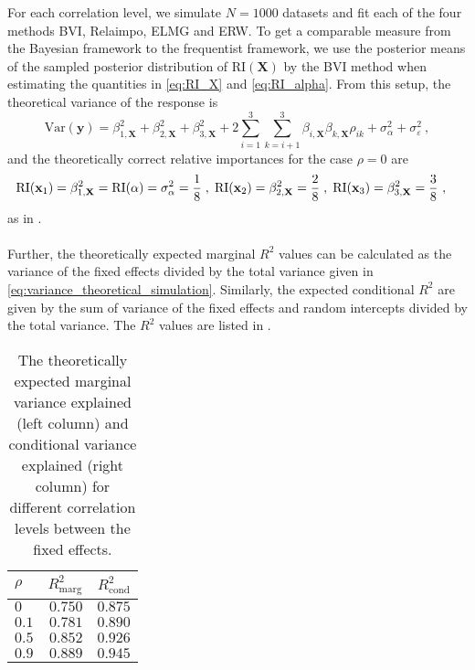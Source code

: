 For each correlation level, we simulate $N=1000$ datasets and fit each of the four methods BVI, Relaimpo, ELMG and ERW.
To get a comparable measure from the Bayesian framework to the frequentist framework, we use the posterior means of the sampled posterior distribution of $\text{RI}(\mathbf{X})$ by the BVI method when estimating the quantities in  \eqref{eq:RI_X} and \eqref{eq:RI_alpha}.
\newline
\newline
From this setup, the theoretical variance of the response is
\begin{equation}
    \label{eq:variance_theoretical_simulation}
    \text{Var}(\mathbf{y}) = \beta_{1, \mathbf{X}}^2 + \beta_{2, \mathbf{X}}^2 + \beta_{3, \mathbf{X}}^2 + 2\sum_{i=1}^{3}\sum_{k=i+1}^{3} \beta_{i, \mathbf{X}}\beta_{k, \mathbf{X}}\rho_{ik} + \sigma_{\alpha}^2 + \sigma^2_{\varepsilon} \ , 
\end{equation}
and the theoretically correct relative importances for the case $\rho=0$ are
\begin{equation}
    \label{eq:RI_theoretical_simulation}
    \begin{aligned}
        \text{RI}(\mathbf{x}_1) =  \beta_{1, \mathbf{X}}^2& = \text{RI}(\alpha) = \sigma^2_{\alpha} = \frac{1}{8} \hspace{1mm}, \hspace{1mm} \text{RI}(\mathbf{x}_2) = \beta_{2, \mathbf{X}}^2 = \frac{2}{8} \hspace{1mm}, \hspace{1mm} \text{RI}(\mathbf{x}_3) = \beta_{3, \mathbf{X}}^2 = \frac{3}{8} \ , 
    \end{aligned}
\end{equation}
as in \citet{gromping_relaimpo}.
\\
\\
Further, the theoretically expected marginal $R^2$ values can be calculated as the variance of the fixed effects divided by the total variance given in \ref{eq:variance_theoretical_simulation}. Similarly, the expected conditional $R^2$ are given by the sum of variance of the fixed effects and random intercepts divided by the total variance. 
The $R^2$ values are listed in .
\begin{table}[H]
    \centering
    \begin{tabular}{lrr}
    \hline
    $\rho$ & $R^2_{\text{marg}}$ & $R^2_{\text{cond}}$\\ 
    \hline
    $0$ & $0.750$ &  $0.875$ \\ 
    $0.1$ & $0.781$ & $0.890$ \\ 
    $0.5$ & $0.852$ & $0.926$\\ 
    $0.9$ & $0.889$ & $0.945$\\ 
    \hline
    \end{tabular}
    \caption[Expected $R^2$ for Gaussian LMM]{The theoretically expected marginal variance explained (left column) and conditional variance explained (right column) for different correlation levels between the fixed effects.}
    \label{table:2}
\end{table}

